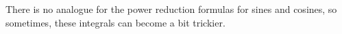 \documentclass{ximera}
\begin{document}
%
%
%
%
%
%
%
%
%
%
%
%
%
There is no analogue for the power reduction formulas for sines and cosines, so sometimes, these integrals can become a bit trickier.
\end{document}
